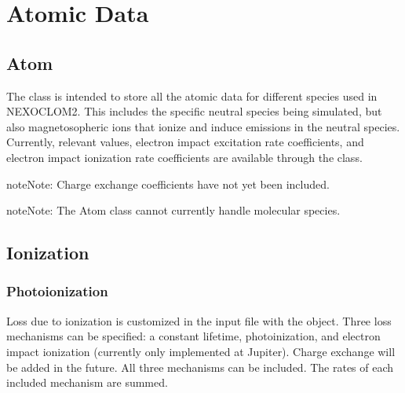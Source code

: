 \documentclass[letterpaper,10pt,english]{sphinxmanual}
\begin{document}
\section{Atomic Data}
\label{\detokenize{nexoclom2/atomicdata:atomic-data}}\label{\detokenize{nexoclom2/atomicdata::doc}}

\subsection{Atom}
\label{\detokenize{nexoclom2/atomicdata:atom}}
\sphinxAtStartPar
The  class is intended to store all the atomic data for different species
used in NEXOCLOM2. This includes the specific neutral species being simulated,
but also magnetosopheric ions that ionize and induce emissions in the neutral
species. Currently, relevant \sphinxhyphen{}values, electron impact excitation rate
coefficients, and electron impact ionization rate coefficients are available
through the  class.

\begin{sphinxadmonition}{note}{Note:}
\sphinxAtStartPar
Charge exchange coefficients have not yet been included.
\end{sphinxadmonition}

\begin{sphinxadmonition}{note}{Note:}
\sphinxAtStartPar
The Atom class cannot currently handle molecular species.
\end{sphinxadmonition}


\subsection{Ionization}
\label{\detokenize{nexoclom2/atomicdata:ionization}}

\subsubsection{Photoionization}
\label{\detokenize{nexoclom2/atomicdata:photoionization}}
\sphinxAtStartPar
Loss due to ionization is customized in the input file with the 
object. Three loss mechanisms can be specified: a constant lifetime,
photoinization, and electron impact ionization (currently only implemented
at Jupiter). Charge exchange will be added in the future. All three mechanisms
can be included. The rates of each included mechanism are summed.
\end{document}
